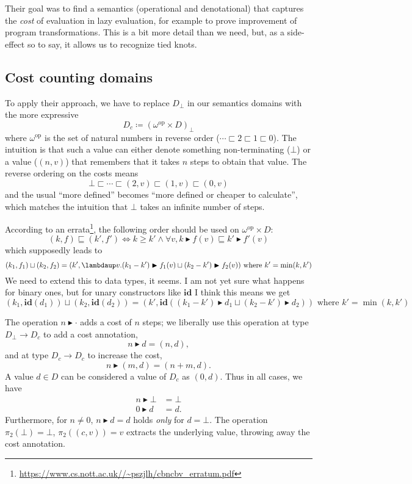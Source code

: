 \documentclass[manuscript,screen,acmsmall,nonacm]{acmart}
\newcommand{\syntax}[1]{\mathbf{#1}}
\newcommand{\slambda}{\syntax{\lambdaup}}
\newcommand{\sId}{\syntax{id}}
\begin{document}
Their goal was to find a semantics (operational and denotational) that captures the \emph{cost} of evaluation in lazy evaluation, for example to prove improvement of program transformations. This is a bit more detail than we need, but, as a side-effect so to say, it allows us to recognize tied knots.


\subsection{Cost counting domains}

\newcommand{\omegaop}{\omega^{\text{op}}}
\newcommand{\bump}{\blacktriangleright}

To apply their approach, we have to replace $D_\bot$ in our semantics domains with the more expressive
\[
D_c \coloneqq (\omegaop \times D)_\bot
\]
where $\omega^{\text{op}}$ is the set of natural numbers in reverse order ($\cdots \sqsubset 2 \sqsubset 1 \sqsubset 0$). The intuition is that such a value can either denote something non-terminating ($\bot$) or a value ($(n,v)$) that remembers that it takes $n$ steps to obtain that value.
The reverse ordering on the costs means
\[
\bot \sqsubset \cdots \sqsubset (2,v) \sqsubset (1,v) \sqsubset (0,v)
\]
and the usual “more defined” becomes “more defined or cheaper to calculate”, which matches the intuition that $\bot$ takes an infinite number of steps.

According to an errata\footnote{\url{https://www.cs.nott.ac.uk//~pszjlh/cbncbv_erratum.pdf}}, the following order should be used on $\omegaop\times D$:
\[
(k,f) \sqsubseteq (k', f') \iff
k \ge k' \wedge \forall v, k \bump f(v) \sqsubseteq k' \bump f'(v)
\]
which supposedly leads to
\[
(k_1,f_1) \sqcup (k_2, f_2) =
(k', \slambda v. (k_1 - k') \bump f_1(v) \sqcup (k_2-k') \bump f_2(v))
\text{ where } k' = \min(k, k')
\]
We need to extend this to data types, it seems. I am not yet sure what happens for binary ones, but for unary constructors like $\sId$ I think this means we get
\[
(k_1,\sId(d_1)) \sqcup (k_2, \sId(d_2)) =
(k', \sId((k_1-k') \bump d_1 \sqcup (k_2 - k') \bump d_2))
\text{ where } k' = \min(k, k')
\]

The operation $n \bump \cdot$ adds a cost of $n$ steps; we liberally use this operation at type $D_\bot \to D_c$ to add a cost annotation,
\[
n \bump d = (n, d),
\]
and at type  $D_c \to D_c$ to increase the cost,
\[
n \bump (m,d) = (n + m, d).
\]
A value $d \in D$ can be considered a value of $D_c$ as $(0, d)$. Thus in all cases, we have
\begin{align*}
n \bump \bot &= \bot\\
0 \bump d &= d.
\end{align*}
Furthermore, for $n \ne 0$, $n \bump d = d$ holds \emph{only} for $d = \bot$.
The operation $\pi_2(\bot) = \bot$,  $\pi_2((c,v)) = v$ extracts the underlying value, throwing away the cost annotation.
\end{document}
